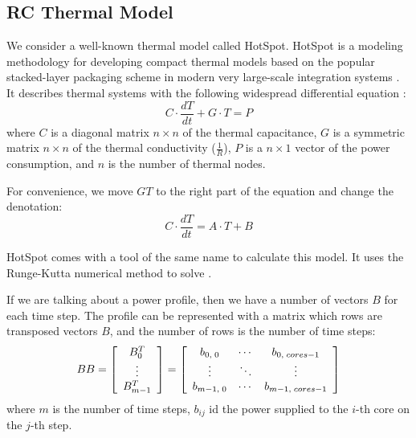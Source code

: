 \subsection{RC Thermal Model}
We consider a well-known thermal model called HotSpot. HotSpot is a modeling methodology for developing compact thermal models based on the popular stacked-layer packaging scheme in modern very large-scale integration systems \cite{huang2006}. It describes thermal systems with the following widespread differential equation \cite{rao2008}:
\[
  C \cdot \frac{dT}{dt} + G \cdot T = P
\]
where $C$ is a diagonal matrix $n \times n$ of the thermal capacitance, $G$ is a symmetric matrix $n \times n$ of the thermal conductivity ($\frac{1}{R}$), $P$ is a $n \times 1$ vector of the power consumption, and $n$ is the number of thermal nodes.

For convenience, we move $GT$ to the right part of the equation and change the denotation:
\begin{equation} \label{eq:initial}
  C \cdot \frac{dT}{dt} = A \cdot T + B
\end{equation}

HotSpot comes with a tool of the same name to calculate this model. It uses the Runge-Kutta numerical method to solve .

If we are talking about a power profile, then we have a number of vectors $B$ for each time step. The profile can be represented with a matrix which rows are transposed vectors $B$, and the number of rows is the number of time steps:
\[
  BB =
    \left[
      \begin{array}{c}
        B_0^T \\
        \vdots \\
        B_{m-1}^T
      \end{array}
    \right] =
    \left[
      \begin{array}{ccc}
        b_{0,\;0} & \cdots & b_{0,\;cores-1} \\
        \vdots & \ddots & \vdots \\
        b_{m-1,\;0} & \cdots & b_{m-1,\;cores-1}
      \end{array}
    \right]
\]
where $m$ is the number of time steps, $b_{ij}$ id the power supplied to the $i$-th core on the $j$-th step.
